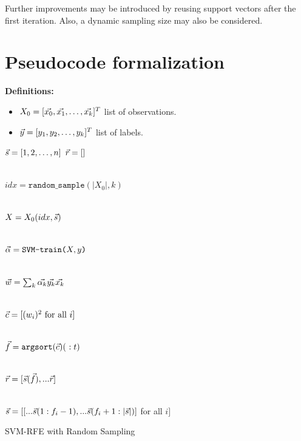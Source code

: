 Further improvements may be introduced by reusing support vectors after the first iteration. Also, a dynamic sampling size may also be considered.

\section{Pseudocode formalization}

\textbf{Definitions:}

\begin{itemize}
    \item $X_0 = [\vec{x_0}, \vec{x_1}, \dotsc, \vec{x_k}]^T$ list of observations.
    \item $\vec{y} = [y_1, y_2, \dotsc, y_k]^T$ list of labels.
\end{itemize}

\begin{algorithm}[H]
    \DontPrintSemicolon
      $\vec{s} = [1,2, \dotsc, n]$ 
      $\vec{r} = []$ 
        {
            \\
            $idx = \texttt{random\_sample}(|X_0|, k)$\VS

            \\
            $X=X_0(idx,\vec{s})$\VS

            \\
            $\vec{\alpha} = \texttt{SVM-train(} X, y \texttt{)}$\VS

            \\
            $\vec{w} = \sum_k{\vec{\alpha_k} \vec{y_k} \vec{x_k}}$\VS

            \\
            $\vec{c} = [(w_i)^2 \text{ for all $i$}]$\VS

            \\
            $\vt{f} = \texttt{argsort}(\vt{c})(\ :t)$\VS

            \\
            $\vec{r} = [\vec{s}(\vec{f}), ...\vec{r}]$\VS

            \\
            $\vec{s} = [[...\vec{s}(1:f_i - 1), ...\vec{s}(f_i + 1:|\vec{s}|)]$ for all $i]$
        }
    \caption{SVM-RFE with Random Sampling}
\end{algorithm}

